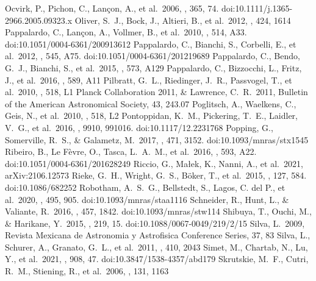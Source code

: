 \documentclass{aa}
\begin{document}
\begin{thebibliography}{}
  Ocvirk, P., Pichon, C., Lan{\c{c}}on, A., et al.\ 2006, \mnras, 365, 74. doi:10.1111/j.1365-2966.2005.09323.x
  Oliver, S.~J., Bock, J., Altieri, B., et al.\ 2012, \mnras, 424, 1614
  Pappalardo, C., Lan{\c{c}}on, A., Vollmer, B., et al.\ 2010, \aap, 514, A33. doi:10.1051/0004-6361/200913612
  Pappalardo, C., Bianchi, S., Corbelli, E., et al.\ 2012, \aap, 545, A75. doi:10.1051/0004-6361/201219689
  Pappalardo, C., Bendo, G.~J., Bianchi, S., et al.\ 2015, \aap, 573, A129
  Pappalardo, C., Bizzocchi, L., Fritz, J., et al.\ 2016, \aap, 589, A11 
  Pilbratt, G.~L., Riedinger, J.~R., Passvogel, T., et al.\ 2010, \aap, 518, L1
  Planck Collaboration 2011, \& Lawrence, C.~R.\ 2011, Bulletin of the American Astronomical Society, 43, 243.07 
  Poglitsch, A., Waelkens, C., Geis, N., et al.\ 2010, \aap, 518, L2
  Pontoppidan, K.~M., Pickering, T.~E., Laidler, V.~G., et al.\ 2016, \procspie, 9910, 991016. doi:10.1117/12.2231768
  Popping, G., Somerville, R.~S., \& Galametz, M.\ 2017, \mnras, 471, 3152. doi:10.1093/mnras/stx1545
  Ribeiro, B., Le F{\`e}vre, O., Tasca, L.~A.~M., et al.\ 2016, \aap, 593, A22. doi:10.1051/0004-6361/201628249
  Riccio, G., Ma{\l}ek, K., Nanni, A., et al.\ 2021, arXiv:2106.12573
  Rieke, G.~H., Wright, G.~S., B{\"o}ker, T., et al.\ 2015, \pasp, 127, 584. doi:10.1086/682252
  Robotham, A.~S.~G., Bellstedt, S., Lagos, C. del P., et al.\ 2020, \mnras, 495, 905. doi:10.1093/mnras/staa1116
  Schneider, R., Hunt, L., \& Valiante, R.\ 2016, \mnras, 457, 1842. doi:10.1093/mnras/stw114
  Shibuya, T., Ouchi, M., \& Harikane, Y.\ 2015, \apjs, 219, 15. doi:10.1088/0067-0049/219/2/15 
  Silva, L.\ 2009, Revista Mexicana de Astronomia y Astrofisica Conference Series, 37, 83
  Silva, L., Schurer, A., Granato, G.~L., et al.\ 2011, \mnras, 410, 2043
  Simet, M., Chartab, N., Lu, Y., et al.\ 2021, \apj, 908, 47. doi:10.3847/1538-4357/abd179
  Skrutskie, M.~F., Cutri, R.~M., Stiening, R., et al.\ 2006, \aj, 131, 1163

\end{thebibliography}
\end{document}
